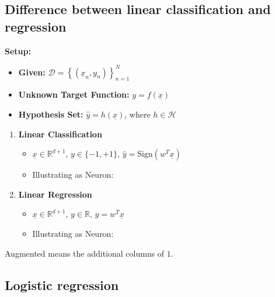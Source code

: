\subsection{Difference between linear classification and regression}
\begin{definition}
    \textbf{Setup:}
    \begin{itemize}
        \item \textbf{Given:} $\mathcal{D} = \left\{ \left( \underline{x}_n, y_n \right) \right\}_{n=1}^{N}$
        \item \textbf{Unknown Target Function:} $y = f(\underline{x})$
        \item \textbf{Hypothesis Set:} $\hat{y} = h(\underline{x})$, where $h \in \mathcal{H}$
    \end{itemize}
    \vspace{1em}

    \begin{enumerate}
        \item \textbf{Linear Classification}
        \begin{itemize}
            \item $\underline{x} \in \mathbb{R}^{d+1}$, $y \in \{-1, +1\}$, $\hat{y} = \text{Sign}\left(w^T \underline{x}\right)$
            \item Illustrating as Neuron:
        \end{itemize}
    
        \item \textbf{Linear Regression}
        \begin{itemize}
            \item $\underline{x} \in \mathbb{R}^{d+1}$, $y \in \mathbb{R}$, $\hat{y} = w^T \underline{x}$
            \item Illustrating as Neuron:
        \end{itemize}
    \end{enumerate}
\end{definition}

\begin{intuition}
    Augmented means the additional columns of $1$.
\end{intuition}

\subsection{Logistic regression}

